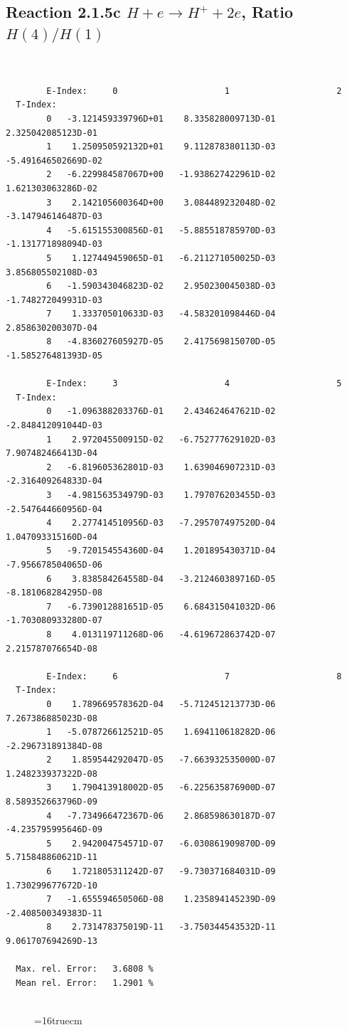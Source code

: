 \documentclass[12pt,dvips]{article}
\begin{document}
\newpage
\subsection{
Reaction 2.1.5c  $H + e \rightarrow H^+ + 2e$, Ratio $H(4)/H(1)$
}


\begin{small}\begin{verbatim}


        E-Index:     0                     1                     2
  T-Index:
        0   -3.121459339796D+01    8.335828009713D-01    2.325042085123D-01
        1    1.250950592132D+01    9.112878380113D-03   -5.491646502669D-02
        2   -6.229984587067D+00   -1.938627422961D-02    1.621303063286D-02
        3    2.142105600364D+00    3.084489232048D-02   -3.147946146487D-03
        4   -5.615155300856D-01   -5.885518785970D-03   -1.131771898094D-03
        5    1.127449459065D-01   -6.211271050025D-03    3.856805502108D-03
        6   -1.590343046823D-02    2.950230045038D-03   -1.748272049931D-03
        7    1.333705010633D-03   -4.583201098446D-04    2.858630200307D-04
        8   -4.836027605927D-05    2.417569815070D-05   -1.585276481393D-05

        E-Index:     3                     4                     5
  T-Index:
        0   -1.096388203376D-01    2.434624647621D-02   -2.848412091044D-03
        1    2.972045500915D-02   -6.752777629102D-03    7.907482466413D-04
        2   -6.819605362801D-03    1.639046907231D-03   -2.316409264833D-04
        3   -4.981563534979D-03    1.797076203455D-03   -2.547644660956D-04
        4    2.277414510956D-03   -7.295707497520D-04    1.047093315160D-04
        5   -9.720154554360D-04    1.201895430371D-04   -7.956678504065D-06
        6    3.838584264558D-04   -3.212460389716D-05   -8.181068284295D-08
        7   -6.739012881651D-05    6.684315041032D-06   -1.703080933280D-07
        8    4.013119711268D-06   -4.619672863742D-07    2.215787076654D-08

        E-Index:     6                     7                     8
  T-Index:
        0    1.789669578362D-04   -5.712451213773D-06    7.267386885023D-08
        1   -5.078726612521D-05    1.694110618282D-06   -2.296731891384D-08
        2    1.859544292047D-05   -7.663932535000D-07    1.248233937322D-08
        3    1.790413918002D-05   -6.225635876900D-07    8.589352663796D-09
        4   -7.734966472367D-06    2.868598630187D-07   -4.235795995646D-09
        5    2.942004754571D-07   -6.030861909870D-09    5.715848860621D-11
        6    1.721805311242D-07   -9.730371684031D-09    1.730299677672D-10
        7   -1.655594650506D-08    1.235894145239D-09   -2.408500349383D-11
        8    2.731478375019D-11   -3.750344543532D-11    9.061707694269D-13

  Max. rel. Error:   3.6808 %
  Mean rel. Error:   1.2901 %


\end{verbatim}\end{small}
\begin{figure} \label{2.1.5c}
\epsfxsize=16truecm
\end{figure}
\end{document}
